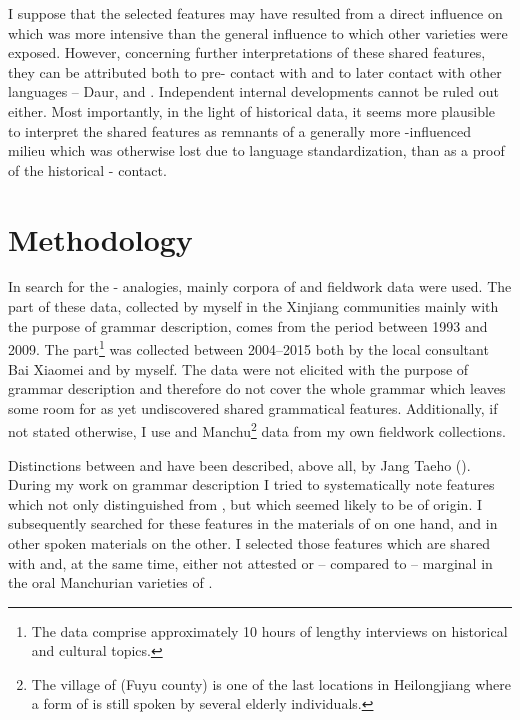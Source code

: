 \documentclass[output=paper,colorlinks,citecolor=brown]{langscibook}
\begin{document}
I suppose that the selected features may have resulted from a direct  influence on  which was more intensive than the general  influence to which other  varieties were exposed. However, concerning further interpretations of these shared features, they can be attributed both to pre- contact with  and to later contact with other  languages – Daur,  and . Independent internal developments cannot be ruled out either. Most importantly, in the light of historical data, it seems more plausible to interpret the shared features as remnants of a generally more -influenced  milieu which was otherwise lost due to language standardization, than as a proof of the historical - contact.

\section{Methodology}
In search for the - analogies, mainly corpora of  and  fieldwork data were used. The  part of these data, collected by myself in the Xinjiang  communities mainly with the purpose of grammar description, comes from the period between 1993 and 2009. The  part\footnote{The  data comprise approximately 10 hours of lengthy interviews on historical and cultural topics.} was collected between 2004--2015 both by the local consultant Bai Xiaomei and by myself. The  data were not elicited with the purpose of grammar description and therefore do not cover the whole  grammar which leaves some room for as yet undiscovered shared grammatical features. Additionally, if not stated otherwise, I use   and  Manchu\footnote{The village of  (Fuyu county) is one of the last locations in Heilongjiang where a form of  is still spoken by several elderly individuals.} data from my own fieldwork collections.

Distinctions between  and  have been described, above all, by Jang Taeho (\citeyear{Jang2008}). During my work on  grammar description I tried to systematically note features which not only distinguished  from , but which seemed likely to be of  origin. I subsequently searched for these features in the materials of  on one hand, and in other spoken  materials on the other. I selected those features which are shared with  and, at the same time, either not attested or – compared to  – marginal in the oral Manchurian varieties of .
\end{document}
